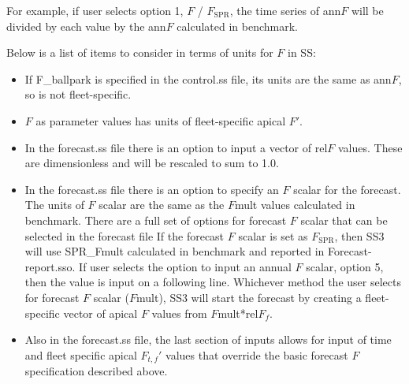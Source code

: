 For example, if user selects option 1, $F$ / $F_\text{SPR}$, the time series of ann$F$ will be divided by each value by the ann$F$ calculated in benchmark.

Below is a list of items to consider in terms of units for $F$ in SS:
\begin{itemize}
	\item If F\_ballpark is specified in the control.ss file, its units are the same as ann$F$, so is not fleet-specific.
	
	\item $F$ as parameter values has units of fleet-specific apical $F'$.
	
	\item In the forecast.ss file there is an option to input a vector of rel$F$ values. These are dimensionless and will be rescaled to sum to 1.0.
	
	\item In the forecast.ss file there is an option to specify an $F$ scalar for the forecast.  The units of $F$ scalar are the same as the $F$mult values calculated in benchmark.  There are a full set of options for forecast $F$ scalar that can be selected in the forecast file 
	If the forecast $F$ scalar is set as $F_\text{SPR}$, then SS3 will use SPR\_Fmult calculated in benchmark and reported in Forecast-report.sso.  If user selects the option to input an annual $F$ scalar, option 5, then the value is input on a following line.  Whichever method the user selects for forecast $F$ scalar ($F$mult), SS3 will start the forecast by creating a fleet-specific vector of apical $F$ values from $F$mult*rel$F_f$.
	
	\item Also in the forecast.ss file, the last section of inputs allows for input of time and fleet specific apical $F_{t,f}'$ values that override the basic forecast $F$ specification described above.
\end{itemize}